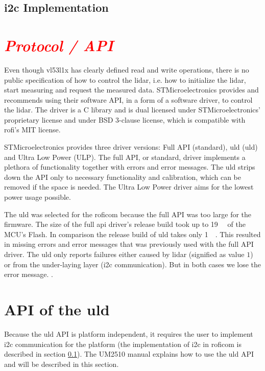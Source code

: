 \documentclass[
  digital,     %
  oneside,     %
  nosansbold,  %
  nocolorbold, %
  lof,         %
  lot,         %
]{fithesis4}
\newcommand{\TODO}[1]{\textcolor{red}{\textit{#1}}}
\begin{document}
{{{\subsection[ I2C Implementation ]{ \acrshort{i2c} Implementation } \label{sec:lidar-i2c-impl}


\section{ \TODO{Protocol / API} }
Even though \gls{vl53l1x} has clearly defined read and write operations, there is no public specification of how to control the \acrshort{lidar}, i.e. how to initialize the \acrshort{lidar}, start measuring and request the measured data. STMicroelectronics provides and recommends using their software API, in a form of a software driver, to control the \acrshort{lidar}. The driver is a C library and is dual licensed under STMicroelectronics' proprietary license and under BSD 3-clause license, which is compatible with \acrshort{rofi}'s MIT license.

STMicroelectronics provides three driver versions: Full API (standard), \acrlong{uld} (\acrshort{uld}) and Ultra Low Power (ULP). The full API, or standard, driver implements a plethora of functionality together with errors and error messages. The \acrlong{uld} strips down the API only to necessary functionality and calibration, which can be removed if the space is needed. The Ultra Low Power driver aims for the lowest power usage possible.

The \acrlong{uld} was selected for the \acrshort{roficom} because the full API was too large for the firmware. The size of the full api driver's release build took up to \qty{19}{\kilo\byte} of the MCU's Flash. In comparison the release build of \acrlong{uld} takes only \qty{1}{\kilo\byte}. This resulted in missing errors and error messages that was previously used with the full API driver. The \acrshort{uld} only reports failures either caused by lidar (signified as value $1$) or from the under-laying layer (\acrshort{i2c} communication). But in both cases we lose the error message. .

\section[ API of the Ultra Lite Driver ]{ API of the \acrlong{uld} } \label{sec:lidar-api}
Because the \acrshort{uld} API is platform independent, it requires the user to implement \acrshort{i2c} communication for the platform (the implementation of \acrshort{i2c} in \acrshort{roficom} is described in section \ref{sec:lidar-i2c-impl}). The UM2510 \cite{um2510} manual explains how to use the \acrshort{uld} API and will be described in this section.

}}}
\end{document}
